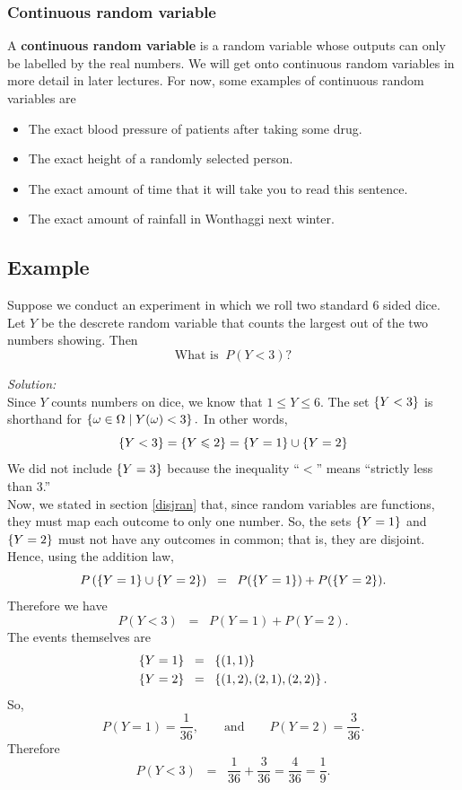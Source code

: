 \subsubsection{Continuous random variable} \label{continuous random variable 1}
\noindent A \textbf{continuous random variable} is a random variable whose outputs can only be labelled by the real numbers. We will get onto continuous random variables in more detail in later lectures. For now, some examples of continuous random variables are 
\begin{itemize}
\item The exact blood pressure of patients after taking some drug.
\item The exact height of a randomly selected person.
\item The exact amount of time that it will take you to read this sentence.
\item The exact amount of rainfall in Wonthaggi next winter.
\end{itemize}


\subsection{Example} \label{example8.2}
Suppose we conduct an experiment in which we roll two standard 6 sided dice. Let $Y$ be the descrete random variable that counts the largest out of the two numbers showing. Then
\[
\text{What is} \;\; P(Y < 3)?
\]

\noindent \textit{Solution:} \\
Since $Y$ counts numbers on dice, we know that $1 \leq Y \leq 6$. The set $\left\{Y < 3\right\}$ is shorthand for $\left\{\omega \in \Omega \mid Y(\omega) < 3\right\}.$ In other words,
\[
\left\{Y < 3\right\} =  \left\{Y \leqslant 2\right\} = \left\{Y = 1\right\} \cup \left\{Y = 2\right\}
\]
We did not include $\left\{Y = 3\right\}$ because the inequality ``$<$'' means ``strictly less than 3.''  \\

\noindent Now, we stated in section \ref{disjran} that, since random variables are functions, they must map each outcome to only one number. So, the sets $\left\{Y = 1\right\}$ and $\left\{Y = 2\right\}$ must not have any outcomes in common; that is, they are disjoint. Hence, using the addition law,
\[
P\left(\left\{Y = 1\right\} \cup \left\{Y = 2\right\}\right) \;\; = \;\; P(\left\{Y = 1\right\}) + P(\left\{Y = 2\right\}).
\]
Therefore we have
\[
P(Y < 3) \;\; = \;\;  P(Y = 1) + P(Y = 2).
\]
The events themselves are
\begin{align*}
\left\{Y = 1\right\} & \;\;=\;\; \left\{(1,1)\right\} \\
\left\{Y = 2\right\} & \;\;=\;\; \left\{(1,2),(2,1),(2,2)\right\}.
\end{align*}
So,
\[
P(Y = 1) = \frac{1}{36}, \qquad \text{and} \qquad P(Y = 2) = \frac{3}{36}.
\]
Therefore
\[
P(Y < 3) \;\; = \;\;  \frac{1}{36} + \frac{3}{36} = \frac{4}{36} = \frac{1}{9}.
\]

